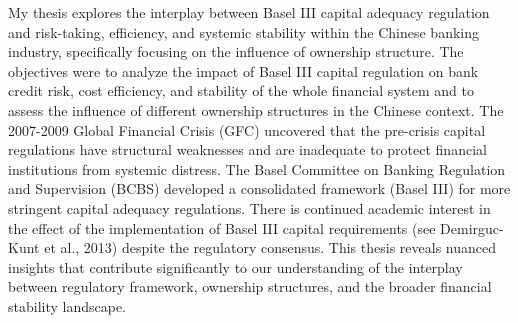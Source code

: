 \documentclass[
  12pt,
  a4paper,
]{scrreprt}
\begin{document}
My thesis explores the interplay between Basel III capital adequacy
regulation and risk-taking, efficiency, and systemic stability within
the Chinese banking industry, specifically focusing on the influence of
ownership structure. The objectives were to analyze the impact of Basel
III capital regulation on bank credit risk, cost efficiency, and
stability of the whole financial system and to assess the influence of
different ownership structures in the Chinese context. The 2007-2009
Global Financial Crisis (GFC) uncovered that the pre-crisis capital
regulations have structural weaknesses and are inadequate to protect
financial institutions from systemic distress. The Basel Committee on
Banking Regulation and Supervision (BCBS) developed a consolidated
framework (Basel III) for more stringent capital adequacy regulations.
There is continued academic interest in the effect of the implementation
of Basel III capital requirements (see Demirguc-Kunt et al., 2013)
despite the regulatory consensus. This thesis reveals nuanced insights
that contribute significantly to our understanding of the interplay
between regulatory framework, ownership structures, and the broader
financial stability landscape.
\end{document}
